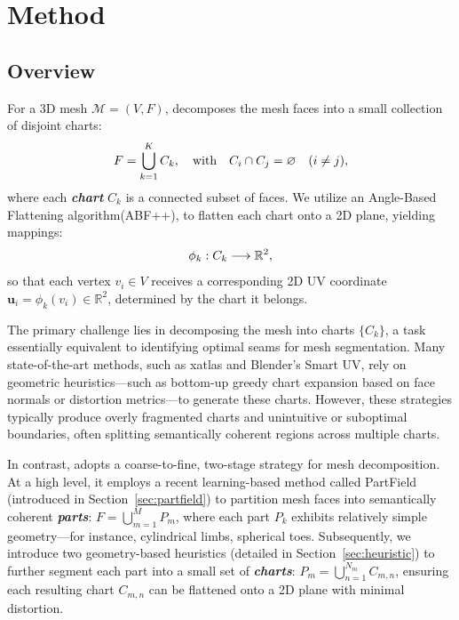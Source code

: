 \section{Method}
\subsection{Overview}
For a 3D mesh $\mathcal{M} = (V,F)$, \ourmodel decomposes the mesh faces into a small collection of disjoint charts:
\vspace{-0.5em}
\begin{equation}
F = \bigcup_{k=1}^{K} C_k, \quad \text{with} \quad C_i \cap C_j = \varnothing \quad (i \neq j),
\vspace{-1ex}
\end{equation}
where each \textbf{\emph{chart}} $C_k$ is a connected subset of faces. We utilize an Angle-Based Flattening algorithm(ABF++), to flatten each chart onto a 2D plane, yielding mappings:
\vspace{-0.5em}
\begin{equation}
\phi_k : C_k \longrightarrow \mathbb{R}^2,
\vspace{-1ex}
\end{equation}
so that each vertex $v_i \in V$ receives a corresponding 2D UV coordinate $\mathbf{u}_i = \phi_k(v_i) \in \mathbb{R}^2$, determined by the chart it belongs.

The primary challenge lies in decomposing the mesh into charts $\{C_k\}$, a task essentially equivalent to identifying optimal seams for mesh segmentation. Many state-of-the-art methods, such as xatlas and Blender's Smart UV, rely on geometric heuristics—such as bottom-up greedy chart expansion based on face normals or distortion metrics—to generate these charts. However, these strategies typically produce overly fragmented charts and unintuitive or suboptimal boundaries, often splitting semantically coherent regions across multiple charts.

In contrast, \ourmodel adopts a coarse-to-fine, two-stage strategy for mesh decomposition. At a high level, it employs a recent learning-based method called PartField (introduced in Section~\ref{sec:partfield}) to partition mesh faces into semantically coherent \textbf{\emph{parts}}: $F = \bigcup_{m=1}^{M} P_m$, where each part $P_k$ exhibits relatively simple geometry—for instance, cylindrical limbs, spherical toes. Subsequently, we introduce two geometry-based heuristics (detailed in Section~\ref{sec:heuristic}) to further segment each part into a small set of \textbf{\emph{charts}}:
$P_m = \bigcup_{n=1}^{N_m} C_{m,n}$, ensuring each resulting chart $C_{m,n}$ can be flattened onto a 2D plane with minimal distortion.

